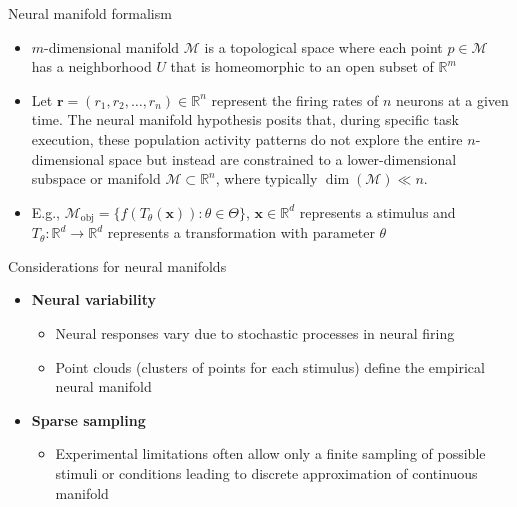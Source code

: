 \documentclass[aspectratio=169]{beamer}
\begin{document}
\begin{frame}{Neural manifold formalism}
    \begin{itemize}
       \item $m$-dimensional manifold $\mathcal{M}$ is a topological space where each point $p \in \mathcal{M}$ has a neighborhood $U$ that is homeomorphic to an open subset of $\mathbb{R}^m$
       \item Let $\mathbf{r} = (r_1, r_2, \ldots, r_n) \in \mathbb{R}^n$ represent the firing rates of $n$ neurons at a given time. The neural manifold hypothesis posits that, during specific task execution, these population activity patterns do not explore the entire $n$-dimensional space but instead are constrained to a lower-dimensional subspace or manifold $\mathcal{M} \subset \mathbb{R}^n$, where typically $\dim(\mathcal{M}) \ll n$.
       \item E.g.,  
        $\mathcal{M}_{\text{obj}} = \{f(T_\theta(\mathbf{x})) : \theta \in \Theta\}$, $\mathbf{x} \in \mathbb{R}^d$ represents a stimulus and $T_\theta: \mathbb{R}^d \rightarrow \mathbb{R}^d$ represents a transformation with parameter $\theta$
    \end{itemize}
\end{frame}

\begin{frame}{Considerations for neural manifolds}
    \begin{itemize}
        \item \textbf{Neural variability}
        \begin{itemize}
       \item Neural responses vary due to stochastic processes in neural firing
       \item  Point clouds (clusters of points for each stimulus) define the empirical neural manifold
    \end{itemize}
        \item \textbf{Sparse sampling}
        \begin{itemize}
            \item Experimental limitations often allow only a finite sampling of possible stimuli or conditions leading to discrete approximation of continuous manifold
        \end{itemize} 
    \end{itemize}
\end{frame}
\end{document}

